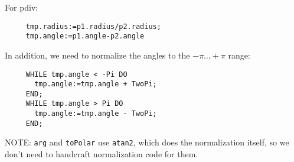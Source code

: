 For pdiv:
\begin{verbatim}
     tmp.radius:=p1.radius/p2.radius;
     tmp.angle:=p1.angle-p2.angle
\end{verbatim}

In addition, we need to normalize the angles to the $-\pi \dots +\pi$
range:
\begin{tt} \begin{verbatim}
     WHILE tmp.angle < -Pi DO
       tmp.angle:=tmp.angle + TwoPi;
     END;
     WHILE tmp.angle > Pi DO
       tmp.angle:=tmp.angle - TwoPi;
     END;
\end{verbatim} \end{tt}

NOTE:  {\tt arg} and {\tt toPolar} use {\tt atan2}, which does
the normalization itself, so we don't need to handcraft
normalization code for them.
